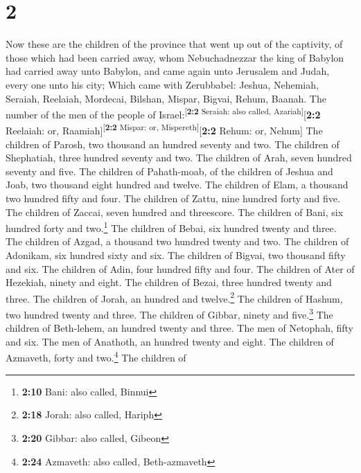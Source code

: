 \hypertarget{section-1}{%
\section{2}\label{section-1}}

 Now these are the children of the province that went up
out of the captivity, of those which had been carried away, whom
Nebuchadnezzar the king of Babylon had carried away unto Babylon, and
came again unto Jerusalem and Judah, every one unto his city;
 Which came with Zerubbabel: Jeshua, Nehemiah, Seraiah,
Reelaiah, Mordecai, Bilshan, Mispar, Bigvai, Rehum, Baanah. The number
of the men of the people of Israel:\textsuperscript{{[}\textbf{2:2}
Seraiah: also called, Azariah{]}}{[}\textbf{2:2} Reelaiah: or,
Raamiah{]}\textsuperscript{{[}\textbf{2:2} Mispar: or,
Mispereth{]}}{[}\textbf{2:2} Rehum: or, Nehum{]}  The
children of Parosh, two thousand an hundred seventy and two.
 The children of Shephatiah, three hundred seventy and
two.  The children of Arah, seven hundred seventy and
five.  The children of Pahath-moab, of the children of
Jeshua and Joab, two thousand eight hundred and twelve. 
The children of Elam, a thousand two hundred fifty and four.
 The children of Zattu, nine hundred forty and five.
 The children of Zaccai, seven hundred and threescore.
 The children of Bani, six hundred forty and
two.\footnote{\textbf{2:10} Bani: also called, Binnui} 
The children of Bebai, six hundred twenty and three.  The
children of Azgad, a thousand two hundred twenty and two.
 The children of Adonikam, six hundred sixty and six.
 The children of Bigvai, two thousand fifty and six.
 The children of Adin, four hundred fifty and four.
 The children of Ater of Hezekiah, ninety and eight.
 The children of Bezai, three hundred twenty and three.
 The children of Jorah, an hundred and twelve.\footnote{\textbf{2:18}
  Jorah: also called, Hariph}  The children of Hashum,
two hundred twenty and three.  The children of Gibbar,
ninety and five.\footnote{\textbf{2:20} Gibbar: also called, Gibeon}
 The children of Beth-lehem, an hundred twenty and three.
 The men of Netophah, fifty and six.  The
men of Anathoth, an hundred twenty and eight.  The
children of Azmaveth, forty and two.\footnote{\textbf{2:24} Azmaveth:
  also called, Beth-azmaveth}  The children of
